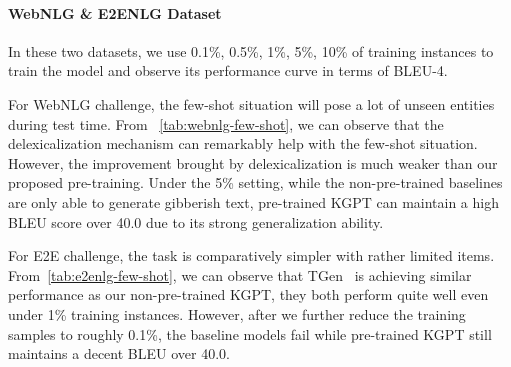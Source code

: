 \documentclass[11pt,a4paper]{article}
\newcommand{\model}{KGPT\xspace}
\begin{document}
\paragraph{WebNLG \& E2ENLG Dataset}
In these two datasets, we use 0.1\%, 0.5\%, 1\%, 5\%, 10\% of training instances to train the model and observe its performance curve in terms of BLEU-4.

For WebNLG challenge, the few-shot situation will pose a lot of unseen entities during test time. From ~\autoref{tab:webnlg-few-shot}, we can observe that the delexicalization mechanism can remarkably help with the few-shot situation. However, the improvement brought by delexicalization is much weaker than our proposed pre-training. Under the 5\% setting, while the non-pre-trained baselines are only able to generate gibberish text, pre-trained \model can maintain a high BLEU score over 40.0 due to its strong generalization ability.  

For E2E challenge, the task is comparatively simpler with rather limited items. From~\autoref{tab:e2enlg-few-shot}, we can observe that TGen~\cite{duvsek2016sequence} is achieving similar performance as our non-pre-trained \model, they both perform quite well even under 1\% training instances. However, after we further reduce the training samples to roughly 0.1\%, the baseline models fail while pre-trained \model still maintains a decent BLEU over 40.0. 
\end{document}
